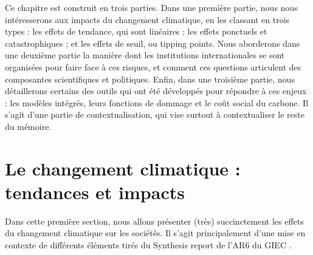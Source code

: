 Ce chapitre est construit en trois parties. Dans une première partie, nous nous intéresserons aux impacts du changement climatique, en les classant en trois types : les effets de tendance, qui sont linéaires ; les effets ponctuels et catastrophiques ; et les effets de seuil, ou tipping points. Nous aborderons dans une deuxième partie la manière dont les institutions internationales se sont organisées pour faire face à ces risques, et comment ces questions articulent des composantes scientifiques et politiques. Enfin, dans une troisième partie, nous détaillerons certains des outils qui ont été développés pour répondre à ces enjeux : les modèles intégrés, leurs fonctions de dommage et le coût social du carbone. Il s'agit d'une partie de contextualisation, qui vise surtout à contextualiser le reste du mémoire. 




\section{Le changement climatique : tendances et impacts}
\label{sect/1/1}

Dans cette première section, nous allons présenter (très) succinctement les effets du changement climatique sur les sociétés. Il s'agit principalement d'une mise en contexte de différents éléments tirés du Synthesis report de l'AR6 du GIEC \cite{lee_ipcc_2023}. \\

